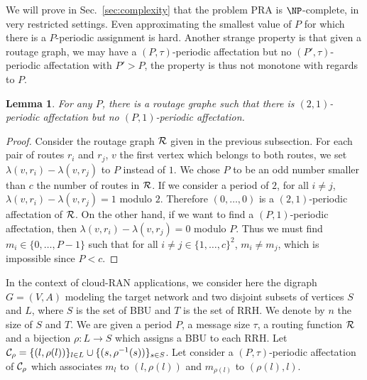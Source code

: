 \documentclass[a4paper,10pt]{article}
\newtheorem{lemma}[theorem]{Lemma}
\begin{document}
      We will prove in Sec.~\ref{sec:complexity} that the problem PRA is $\NP$-complete, in very restricted settings.
      Even approximating the smallest value of $P$ for which there is a $P$-periodic assignment is hard.
      Another strange property is that given a routage graph, we may have a $(P,\tau)$-periodic affectation but no
      $(P',\tau)$-periodic affectation with $P' > P$, the property is thus not monotone with regards to $P$.

	\begin{lemma} 
	 For any $P$, there is a routage graphe such that there is $(2,1)$-periodic affectation but no $(P,1)$-periodic affectation.
	\end{lemma}
\begin{proof}
      Consider the routage graph ${\cal R}$ given in the previous subsection. 
      For each pair of routes $r_i$ and $r_j$, $v$ the first vertex which belongs to both routes,
      we set $\lambda(v,r_i) - \lambda(v,r_j)$ to $P$ instead of $1$. We chose $P$ to be an odd number smaller than $c$ the number of routes in ${\cal R}$. If we consider a period of $2$, for all $i \neq j$, $\lambda(v,r_i) - \lambda(v,r_j) = 1 $ modulo $2$. Therefore $(0,\dots,0)$ is a $(2,1)$-periodic affectation of ${\cal R}$.
      On the other hand, if we want to find a $(P,1)$-periodic affectation, then $\lambda(v,r_i) - \lambda(v,r_j) = 0 $ modulo $P$.
      Thus we must find $m_i \in \{0,\dots,P-1\}$ such that for all $i \neq j \in \{1,\dots,c\}^2$, $m_i \neq m_j$, which is impossible since $P < c$. 
      
\end{proof}
      
% 

      
      In the context of cloud-RAN applications, we consider here the digraph $G=(V,A)$ modeling the target network 
      and two disjoint subsets of vertices $S$ and $L$, where $S$ is the set of BBU and $T$ is the set of RRH. 
      We denote by $n$ the size of $S$ and $T$. We are given a period $P$, a message size $\tau$, a routing function ${\cal R}$ and a bijection $\rho:L\rightarrow S$ which assigns a BBU to each RRH. Let ${\cal C}_{\rho} = \{(l,\rho(l))\}_{l \in L} \cup \{(s,\rho^{-1}(s))\}_{s \in S}$. Let consider a $(P,\tau)$-periodic affectation of ${\cal C}_{\rho}$ which associates $m_l$ to 
      $(l,\rho(l))$ and $m_{\rho(l)}$ to $(\rho(l),l)$.  
      
\end{document}
